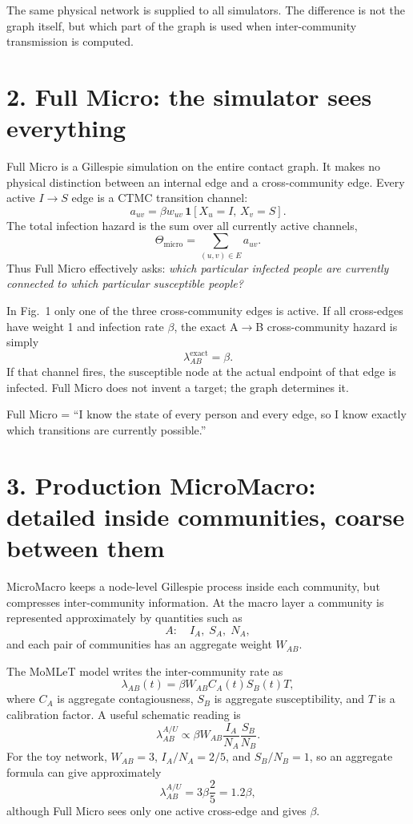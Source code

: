 \documentclass[11pt,a4paper]{article}
\begin{document}
The same physical network is supplied to all simulators. The difference is not the graph itself, but which part of the graph is used when inter-community transmission is computed.

\section*{2. Full Micro: the simulator sees everything}
Full Micro is a Gillespie simulation on the entire contact graph. It makes no physical distinction between an internal edge and a cross-community edge. Every active $I\to S$ edge is a CTMC transition channel:
\[
a_{uv}=\beta w_{uv}\,\mathbf{1}[X_u=I,\,X_v=S].
\]
The total infection hazard is the sum over all currently active channels,
\[
\Theta_{\mathrm{micro}}=\sum_{(u,v)\in E} a_{uv}.
\]
Thus Full Micro effectively asks: \emph{which particular infected people are currently connected to which particular susceptible people?}

In Fig.~1 only one of the three cross-community edges is active. If all cross-edges have weight 1 and infection rate $\beta$, the exact A$\to$B cross-community hazard is simply
\[
\lambda^{\mathrm{exact}}_{AB}=\beta.
\]
If that channel fires, the susceptible node at the actual endpoint of that edge is infected. Full Micro does not invent a target; the graph determines it.

\begin{tcolorbox}[colback=soft,colframe=exact,title=Intuition]
Full Micro = ``I know the state of every person and every edge, so I know exactly which transitions are currently possible.''
\end{tcolorbox}

\section*{3. Production MicroMacro: detailed inside communities, coarse between them}
MicroMacro keeps a node-level Gillespie process inside each community, but compresses inter-community information. At the macro layer a community is represented approximately by quantities such as
\[
A:\quad I_A,\;S_A,\;N_A,
\]
and each pair of communities has an aggregate weight $W_{AB}$.

The MoMLeT model writes the inter-community rate as
\[
\lambda_{AB}(t)=\beta W_{AB} C_A(t)S_B(t)T,
\]
where $C_A$ is aggregate contagiousness, $S_B$ is aggregate susceptibility, and $T$ is a calibration factor. A useful schematic reading is
\[
\lambda^{A/U}_{AB}\propto \beta W_{AB}\frac{I_A}{N_A}\frac{S_B}{N_B}.
\]
For the toy network, $W_{AB}=3$, $I_A/N_A=2/5$, and $S_B/N_B=1$, so an aggregate formula can give approximately
\[
\lambda^{A/U}_{AB}=3\beta\frac{2}{5}=1.2\beta,
\]
although Full Micro sees only one active cross-edge and gives $\beta$.
\end{document}
